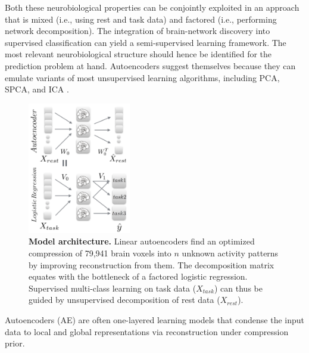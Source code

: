 \documentclass{article} %
\begin{document}
Both these neurobiological properties can be conjointly exploited in an
approach that is
mixed (i.e., using rest and task data)
and 
factored (i.e., performing network decomposition).
%
The integration of brain-network discovery into
supervised classification can yield a semi-supervised learning
framework. The most relevant
neurobiological structure should hence be identified
for the prediction problem at hand.
%
Autoencoders suggest themselves because they can emulate
variants of most unsupervised learning algorithms,
including PCA, SPCA, and ICA \cite{hinton06}.
\begin{figure}
  \centering
    \includegraphics[width=0.40\textwidth]{figures/figure1.png}
  \vspace{-0.7cm}
  \caption {\textbf{Model architecture.}
  Linear autoencoders find an optimized compression of 79,941 brain voxels
  into $n$ unknown activity patterns by improving reconstruction from them.
  The decomposition matrix equates with the bottleneck of
  a factored logistic regression.
  Supervised multi-class learning on task data ($X_{task}$)
  can thus be guided by
  unsupervised decomposition of rest data ($X_{rest}$).
  }
\end{figure}
%
Autoencoders (AE)
are often one-layered learning models 
that condense the input data to
local and global 
representations
via reconstruction under compression prior.
%
\end{document}
